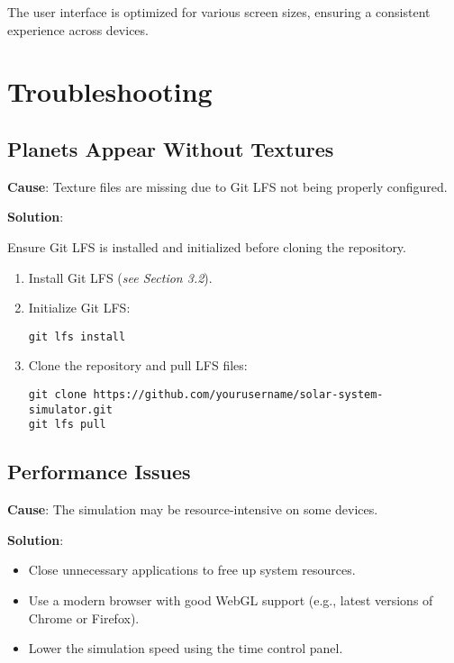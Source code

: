 \documentclass[12pt, a4paper]{article}
\begin{document}
The user interface is optimized for various screen sizes, ensuring a consistent
experience across devices.

\section{Troubleshooting}

\subsection{Planets Appear Without Textures}

\textbf{Cause}: Texture files are missing due to Git LFS not being properly configured.

\textbf{Solution}:

Ensure Git LFS is installed and initialized before cloning the repository.

\begin{enumerate}
    \item Install Git LFS (\textit{see Section 3.2}).
    \item Initialize Git LFS:

          \begin{verbatim}
git lfs install
    \end{verbatim}

    \item Clone the repository and pull LFS files:

          \begin{verbatim}
git clone https://github.com/yourusername/solar-system-simulator.git
git lfs pull
    \end{verbatim}

\end{enumerate}

\subsection{Performance Issues}

\textbf{Cause}: The simulation may be resource-intensive on some devices.

\textbf{Solution}:

\begin{itemize}
    \item Close unnecessary applications to free up system resources.
    \item Use a modern browser with good WebGL support (e.g., latest versions of Chrome
          or Firefox).
    \item Lower the simulation speed using the time control panel.
\end{itemize}
\end{document}
